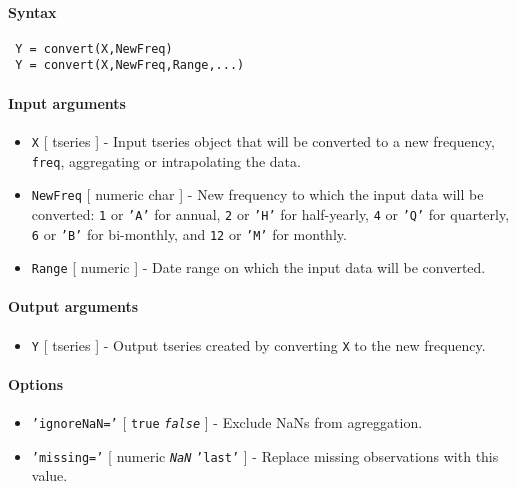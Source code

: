 


	\paragraph{Syntax}
 
 \begin{verbatim}
 Y = convert(X,NewFreq)
 Y = convert(X,NewFreq,Range,...)
 \end{verbatim}
 
 \paragraph{Input arguments}
 
 \begin{itemize}
 \item
   \texttt{X} {[} tseries {]} - Input tseries object that will be
   converted to a new frequency, \texttt{freq}, aggregating or
   intrapolating the data.
 \item
   \texttt{NewFreq} {[} numeric \textbar{} char {]} - New frequency to
   which the input data will be converted: \texttt{1} or \texttt{'A'} for
   annual, \texttt{2} or \texttt{'H'} for half-yearly, \texttt{4} or
   \texttt{'Q'} for quarterly, \texttt{6} or \texttt{'B'} for bi-monthly,
   and \texttt{12} or \texttt{'M'} for monthly.
 \item
   \texttt{Range} {[} numeric {]} - Date range on which the input data
   will be converted.
 \end{itemize}
 
 \paragraph{Output arguments}
 
 \begin{itemize}
 \item
   \texttt{Y} {[} tseries {]} - Output tseries created by converting
   \texttt{X} to the new frequency.
 \end{itemize}
 
 \paragraph{Options}
 
 \begin{itemize}
 \item
   \texttt{'ignoreNaN='} {[} \texttt{true} \textbar{}
   \emph{\texttt{false}} {]} - Exclude NaNs from agreggation.
 \item
   \texttt{'missing='} {[} numeric \textbar{} \emph{\texttt{NaN}}
   \textbar{} \texttt{'last'} {]} - Replace missing observations with
   this value.
 \end{itemize}
 
